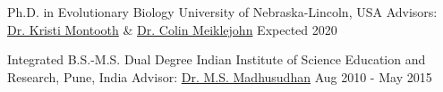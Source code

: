 

\begin{cventries}

  \eduentry
    {Ph.D. in Evolutionary Biology}  %
    {University of Nebraska-Lincoln, USA}  %
    {Advisors: \href{http://montoothlab.unl.edu/}{Dr. Kristi Montooth} \& \href{http://meiklejohnlab.unl.edu/}{Dr. Colin Meiklejohn}}  %
    {Expected 2020}  %

  \vspace{2.0mm} %

  \eduentry
    {Integrated B.S.-M.S. Dual Degree} %
    {Indian Institute of Science Education and Research, Pune, India} %
    {Advisor: \href{http://cospi.iiserpune.ac.in/cospi/}{Dr. M.S. Madhusudhan}} %
    {Aug 2010 - May 2015} %

\end{cventries}
